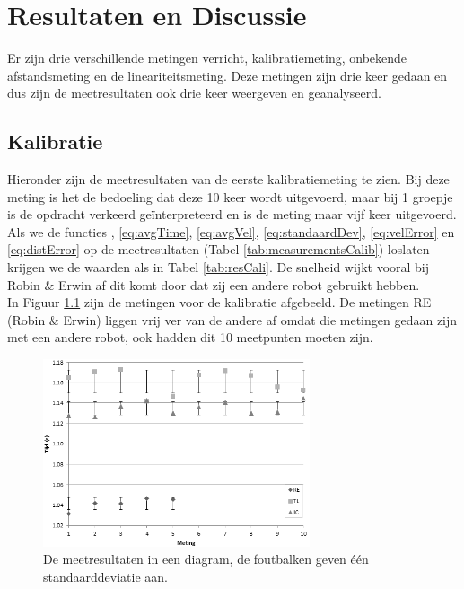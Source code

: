 \documentclass{report}
\begin{document}
\chapter{Resultaten en Discussie}
Er zijn drie verschillende metingen verricht, kalibratiemeting, onbekende afstandsmeting en de lineariteitsmeting. Deze metingen zijn drie keer gedaan en dus zijn de meetresultaten ook drie keer weergeven en geanalyseerd.
\section{Kalibratie}
Hieronder zijn de meetresultaten van de eerste kalibratiemeting te zien. Bij deze meting is het de bedoeling dat deze 10 keer wordt uitgevoerd, maar bij 1 groepje is de opdracht verkeerd ge\"interpreteerd en is de meting maar vijf keer uitgevoerd.\\

Als we de functies \label{eq:vel}, \ref{eq:avgTime},  \ref{eq:avgVel},  \ref{eq:standaardDev},  \ref{eq:velError} en  \ref{eq:distError} op de meetresultaten (Tabel \ref{tab:measurementsCalib}) loslaten krijgen we de waarden als in Tabel \ref{tab:resCali}. De snelheid wijkt vooral bij Robin \& Erwin af dit komt door dat zij een andere robot gebruikt hebben.\\

In Figuur \ref{fig:measureGraph} zijn de metingen voor de kalibratie afgebeeld. De metingen RE (Robin \& Erwin) liggen vrij ver van de andere af omdat die metingen gedaan zijn met een andere robot, ook hadden dit 10 meetpunten moeten zijn.

\begin{figure}[H]
	\centering
	\includegraphics[width=0.7\textwidth]{kalibratie}
	\caption{De meetresultaten in een diagram, de foutbalken geven één standaarddeviatie aan.}
	\label{fig:measureGraph}
\end{figure}
\end{document}
